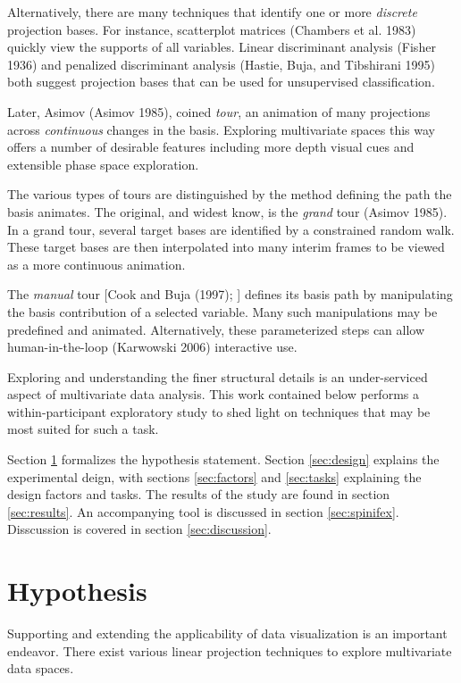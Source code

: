 \documentclass[
]{article}
\begin{document}
Alternatively, there are many techniques that identify one or more
\emph{discrete} projection bases. For instance, scatterplot matrices
(Chambers et al. 1983) quickly view the supports of all variables.
Linear discriminant analysis (Fisher 1936) and penalized discriminant
analysis (Hastie, Buja, and Tibshirani 1995) both suggest projection
bases that can be used for unsupervised classification.

Later, Asimov (Asimov 1985), coined \emph{tour}, an animation of many
projections across \emph{continuous} changes in the basis. Exploring
multivariate spaces this way offers a number of desirable features
including more depth visual cues and extensible phase space exploration.

The various types of tours are distinguished by the method defining the
path the basis animates. The original, and widest know, is the
\emph{grand} tour (Asimov 1985). In a grand tour, several target bases
are identified by a constrained random walk. These target bases are then
interpolated into many interim frames to be viewed as a more continuous
animation.

The \emph{manual} tour {[}Cook and Buja (1997); {]} defines its basis
path by manipulating the basis contribution of a selected variable. Many
such manipulations may be predefined and animated. Alternatively, these
parameterized steps can allow human-in-the-loop (Karwowski 2006)
interactive use.

Exploring and understanding the finer structural details is an
under-serviced aspect of multivariate data analysis. This work contained
below performs a within-participant exploratory study to shed light on
techniques that may be most suited for such a task.

Section \ref{sec:hypothesis} formalizes the hypothesis statement.
Section \ref{sec:design} explains the experimental deign, with sections
\ref{sec:factors} and \ref{sec:tasks} explaining the design factors and
tasks. The results of the study are found in section \ref{sec:results}.
An accompanying tool is discussed in section \ref{sec:spinifex}.
Disscussion is covered in section \ref{sec:discussion}.

\hypertarget{sec:hypothesis}{%
\section{Hypothesis}\label{sec:hypothesis}}

Supporting and extending the applicability of data visualization is an
important endeavor. There exist various linear projection techniques to
explore multivariate data spaces.
\end{document}
